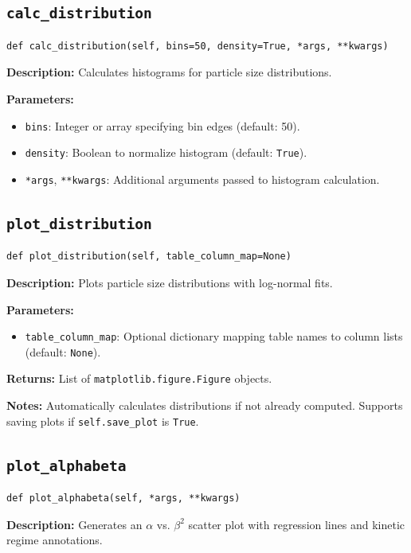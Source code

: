 \documentclass[
	ngerman,							%
	a4paper,							%
	11pt,							%
	oneside							%
	]{article}							%
\begin{document}
\subsection{\texttt{calc\_distribution}}
\begin{lstlisting}
def calc_distribution(self, bins=50, density=True, *args, **kwargs)
\end{lstlisting}
\textbf{Description:} Calculates histograms for particle size distributions.

\textbf{Parameters:}
\begin{itemize}
    \item \texttt{bins}: Integer or array specifying bin edges (default: 50).
    \item \texttt{density}: Boolean to normalize histogram (default: \texttt{True}).
    \item \texttt{*args}, \texttt{**kwargs}: Additional arguments passed to histogram calculation.
\end{itemize}

\subsection{\texttt{plot\_distribution}}
\begin{lstlisting}
def plot_distribution(self, table_column_map=None)
\end{lstlisting}
\textbf{Description:} Plots particle size distributions with log-normal fits.

\textbf{Parameters:}
\begin{itemize}
    \item \texttt{table\_column\_map}: Optional dictionary mapping table names to column lists (default: \texttt{None}).
\end{itemize}

\textbf{Returns:} List of \texttt{matplotlib.figure.Figure} objects.

\textbf{Notes:} Automatically calculates distributions if not already computed. Supports saving plots if \texttt{self.save\_plot} is \texttt{True}.

\subsection{\texttt{plot\_alphabeta}}
\begin{lstlisting}
def plot_alphabeta(self, *args, **kwargs)
\end{lstlisting}
\textbf{Description:} Generates an $\alpha$ vs. $\beta^2$ scatter plot with regression lines and kinetic regime annotations.
\end{document}
